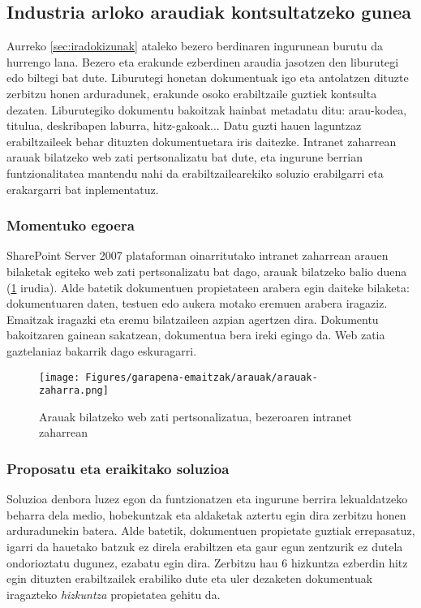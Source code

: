 \subsection{Industria arloko araudiak kontsultatzeko gunea}
Aurreko \ref{sec:iradokizunak} ataleko bezero berdinaren ingurunean burutu da hurrengo lana. Bezero eta erakunde ezberdinen araudia jasotzen den liburutegi edo biltegi bat dute. Liburutegi honetan dokumentuak igo eta antolatzen dituzte zerbitzu honen arduradunek, erakunde osoko erabiltzaile guztiek kontsulta dezaten. Liburutegiko dokumentu bakoitzak hainbat metadatu ditu: arau-kodea, titulua, deskribapen laburra, hitz-gakoak... Datu guzti hauen laguntzaz erabiltzaileek behar dituzten dokumentuetara iris daitezke. Intranet zaharrean arauak bilatzeko web zati pertsonalizatu bat dute, eta ingurune berrian funtzionalitatea mantendu nahi da erabiltzailearekiko soluzio erabilgarri eta erakargarri bat inplementatuz.

\subsubsection{Momentuko egoera}
SharePoint Server 2007 plataforman oinarritutako intranet zaharrean arauen bilaketak egiteko web zati pertsonalizatu bat dago, arauak bilatzeko balio duena (\ref{arauak-old} irudia). Alde batetik dokumentuen propietateen arabera egin daiteke bilaketa: dokumentuaren daten, testuen edo aukera motako eremuen arabera iragaziz. Emaitzak iragazki eta eremu bilatzaileen azpian agertzen dira. Dokumentu bakoitzaren gainean sakatzean, dokumentua bera ireki egingo da. Web zatia gaztelaniaz bakarrik dago eskuragarri.

\begin{figure}[H]
\centering
\texttt{[image: Figures/garapena-emaitzak/arauak/arauak-zaharra.png]}
\caption{Arauak bilatzeko web zati pertsonalizatua, bezeroaren intranet zaharrean}
\label{arauak-old}
\end{figure}

\subsubsection{Proposatu eta eraikitako soluzioa}
Soluzioa denbora luzez egon da funtzionatzen eta ingurune berrira lekualdatzeko beharra dela medio, hobekuntzak eta aldaketak aztertu egin dira zerbitzu honen arduradunekin batera.
Alde batetik, dokumentuen propietate guztiak errepasatuz, igarri da hauetako batzuk ez direla erabiltzen eta gaur egun zentzurik ez dutela ondorioztatu dugunez, ezabatu egin dira.
Zerbitzu hau 6 hizkuntza ezberdin hitz egin dituzten erabiltzailek erabiliko dute eta uler dezaketen dokumentuak iragazteko \textit{hizkuntza} propietatea gehitu da.

